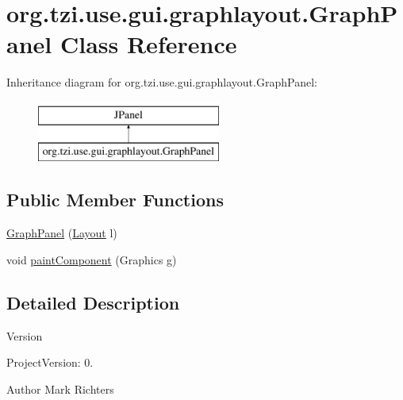 \hypertarget{classorg_1_1tzi_1_1use_1_1gui_1_1graphlayout_1_1_graph_panel}{\section{org.\-tzi.\-use.\-gui.\-graphlayout.\-Graph\-Panel Class Reference}
\label{classorg_1_1tzi_1_1use_1_1gui_1_1graphlayout_1_1_graph_panel}
}
Inheritance diagram for org.\-tzi.\-use.\-gui.\-graphlayout.\-Graph\-Panel\-:\begin{figure}[H]
\begin{center}
\leavevmode
\includegraphics[height=2.000000cm]{classorg_1_1tzi_1_1use_1_1gui_1_1graphlayout_1_1_graph_panel}
\end{center}
\end{figure}
\subsection*{Public Member Functions}
\begin{DoxyCompactItemize}
\item 
\hyperlink{classorg_1_1tzi_1_1use_1_1gui_1_1graphlayout_1_1_graph_panel_afdccabd9d3055d4519d648fe2c4cbf30}{Graph\-Panel} (\hyperlink{classorg_1_1tzi_1_1use_1_1gui_1_1graphlayout_1_1_layout}{Layout} l)
\item 
void \hyperlink{classorg_1_1tzi_1_1use_1_1gui_1_1graphlayout_1_1_graph_panel_ae6ec4566b840ee11d955f9a9b8837ed0}{paint\-Component} (Graphics g)
\end{DoxyCompactItemize}


\subsection{Detailed Description}
\begin{DoxyVersion}{Version}

\end{DoxyVersion}
\begin{DoxyParagraph}{Project\-Version\-:}
0. 
\end{DoxyParagraph}
\begin{DoxyAuthor}{Author}
Mark Richters 
\end{DoxyAuthor}


